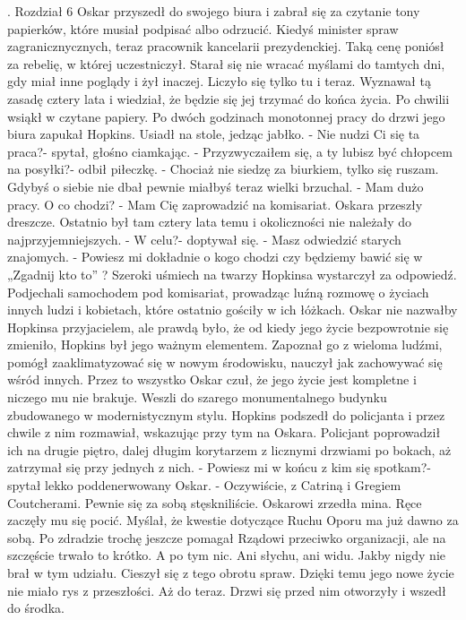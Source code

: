 \documentclass[12pt,a4paper]{book}
\begin{document}
 


.
Rozdział 6
Oskar przyszedł do swojego biura i zabrał się za czytanie tony papierków, które musiał podpisać albo odrzucić. Kiedyś minister spraw zagranicznycznych, teraz pracownik kancelarii prezydenckiej. Taką cenę poniósł za rebelię, w której uczestniczył. Starał się nie wracać myślami do tamtych dni, gdy miał inne poglądy i żył inaczej. Liczyło się tylko tu i teraz. Wyznawał tą zasadę cztery lata i wiedział, że będzie się jej trzymać do końca życia. Po chwilii wsiąkł w czytane papiery. Po dwóch godzinach monotonnej pracy do drzwi jego biura zapukał Hopkins. Usiadł na stole, jedząc jabłko. 
- Nie nudzi Ci się ta praca?- spytał, głośno ciamkając.
- Przyzwyczaiłem się, a ty lubisz być chłopcem na posyłki?- odbił piłeczkę. 
- Chociaż nie siedzę za biurkiem, tylko się ruszam. Gdybyś o siebie nie dbał pewnie miałbyś teraz wielki brzuchal. 
- Mam dużo pracy. O co chodzi?
- Mam Cię zaprowadzić na komisariat. 
Oskara przeszły dreszcze. Ostatnio był tam cztery lata temu i okoliczności nie należały do najprzyjemniejszych. 
- W celu?- doptywał się. 
- Masz odwiedzić starych znajomych.
- Powiesz mi dokładnie o kogo chodzi czy będziemy bawić się w    „Zgadnij kto to” ?
Szeroki uśmiech na twarzy Hopkinsa wystarczył za odpowiedź.
Podjechali samochodem pod komisariat, prowadząc luźną rozmowę o życiach innych ludzi i kobietach, które ostatnio gościły w ich łóżkach. Oskar nie nazwałby Hopkinsa przyjacielem, ale prawdą było, że od kiedy jego życie bezpowrotnie się zmieniło, Hopkins był jego ważnym elementem. Zapoznał go z wieloma ludźmi, pomógł zaaklimatyzować się w nowym środowisku, nauczył jak zachowywać się wśród innych. Przez to wszystko Oskar czuł, że jego życie jest kompletne i niczego mu nie brakuje. 
Weszli do szarego monumentalnego budynku zbudowanego w modernistycznym stylu. Hopkins podszedł do policjanta i przez chwile z nim rozmawiał, wskazując przy tym na Oskara. Policjant poprowadził ich na drugie piętro, dalej długim korytarzem z licznymi drzwiami po bokach, aż zatrzymał się przy jednych z nich. 
- Powiesz mi w końcu z kim się spotkam?- spytał lekko poddenerwowany Oskar. 
- Oczywiście, z Catriną i Gregiem Coutcherami. Pewnie się za sobą stęskniliście. 
Oskarowi zrzedła mina. Ręce zaczęły mu się pocić. Myślał, że kwestie dotyczące Ruchu Oporu ma już dawno za sobą. Po zdradzie trochę jeszcze pomagał Rządowi przeciwko organizacji, ale na szczęście trwało to krótko. A po tym nic. Ani słychu, ani widu. Jakby nigdy nie brał w tym udziału. Cieszył się z tego obrotu spraw. Dzięki temu jego nowe życie nie miało rys z przeszłości. Aż do teraz. Drzwi się przed nim otworzyły i wszedł do środka. 
\end{document}
